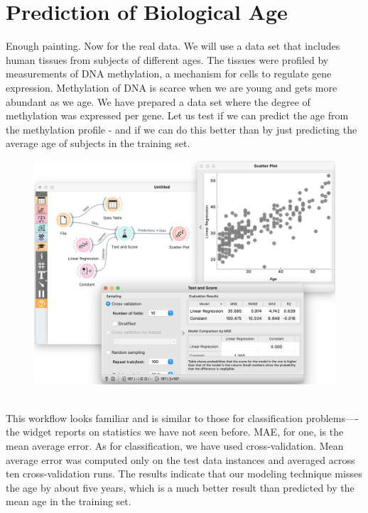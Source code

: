 \chapter{Prediction of Biological Age}
\label{ch:methylation}

Enough painting.  Now for the real data. We will use a data set that includes human tissues from subjects of different ages. The tissues were profiled by measurements of DNA methylation, a mechanism for cells to regulate gene expression. Methylation of DNA is scarce when we are young and gets more abundant as we age. We have prepared a data set where the degree of methylation was expressed per gene. Let us test if we can predict the age from the methylation profile - and if we can do this better than by just predicting the average age of subjects in the training set.

\begin{figure}[h]
    \centering
    \includegraphics[scale=0.35]{methylation.png}
    \caption{$\;$}
\end{figure}

This workflow looks familiar and is similar to those for classification problems—-the  widget reports on statistics we have not seen before. MAE, for one, is the mean average error. As for classification, we have used cross-validation. Mean average error was computed only on the test data instances and averaged across ten cross-validation runs. The results indicate that our modeling technique misses the age by about five years, which is a much better result than predicted by the mean age in the training set.